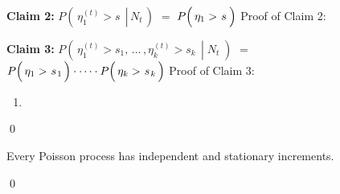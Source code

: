 \vskip 0.5cm
\noindent
\textbf{Claim 2:}\quad
$P\!\left(\,\left.\eta^{(t)}_{1} > s \;\,\right\vert\, N_{t}\,\right)$\;
$=$
\;$P\!\left(\,\eta_{1} > \overset{{\color{white}-}}{s}\,\right)$
\vskip 0.2cm
\noindent
Proof of Claim 2:\quad


\vskip 0.5cm
\noindent
\textbf{Claim 3:}\quad
$P\!\left(\,\left.\eta^{(t)}_{1} > s_{1}, \,\ldots\, ,\eta^{(t)}_{k} > s_{k} \,\;\right\vert\; N_{t}\;\right)$\;
$=$
\;$P\!\left(\,\eta_{1} > \overset{{\color{white}-}}{s}_{1}\,\right) \cdot \cdots \cdot P\!\left(\,\eta_{k} > \overset{{\color{white}-}}{s}_{k}\,\right)$
\vskip 0.2cm
\noindent
Proof of Claim 3:\quad


\begin{enumerate}
\item
\end{enumerate}
\qed


\vskip 0.5cm
\begin{corollary}
\mbox{}
\vskip 0.15cm
\noindent
Every Poisson process has independent and stationary increments.
\end{corollary}
\proof

\qed


\renewcommand{\theenumi}{\roman{enumi}}
\renewcommand{\labelenumi}{\textnormal{(\theenumi)}$\;\;$}

